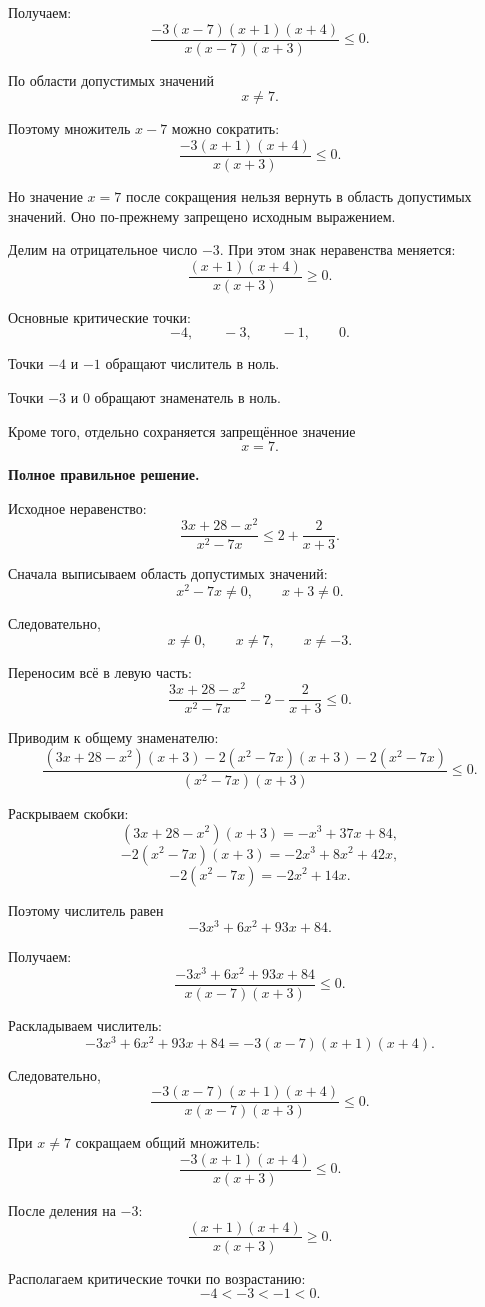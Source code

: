 \documentclass[12pt,a4paper]{article}
\begin{document}
Получаем:
\[
\frac{-3(x-7)(x+1)(x+4)}
{x(x-7)(x+3)}
\le0.
\]

По области допустимых значений
\[
x\ne7.
\]

Поэтому множитель $x-7$ можно сократить:
\[
\frac{-3(x+1)(x+4)}
{x(x+3)}
\le0.
\]

Но значение $x=7$ после сокращения нельзя вернуть в область допустимых
значений. Оно по-прежнему запрещено исходным выражением.

Делим на отрицательное число $-3$. При этом знак неравенства меняется:
\[
\frac{(x+1)(x+4)}
{x(x+3)}
\ge0.
\]

Основные критические точки:
\[
-4,\qquad -3,\qquad -1,\qquad 0.
\]

Точки $-4$ и $-1$ обращают числитель в ноль.

Точки $-3$ и $0$ обращают знаменатель в ноль.

Кроме того, отдельно сохраняется запрещённое значение
\[
x=7.
\]

\textbf{Полное правильное решение.}

Исходное неравенство:
\[
\frac{3x+28-x^2}{x^2-7x}
\le
2+\frac{2}{x+3}.
\]

Сначала выписываем область допустимых значений:
\[
x^2-7x\ne0,
\qquad
x+3\ne0.
\]

Следовательно,
\[
x\ne0,\qquad x\ne7,\qquad x\ne-3.
\]

Переносим всё в левую часть:
\[
\frac{3x+28-x^2}{x^2-7x}
-
2
-
\frac{2}{x+3}
\le0.
\]

Приводим к общему знаменателю:
\[
\frac{
(3x+28-x^2)(x+3)
-2(x^2-7x)(x+3)
-2(x^2-7x)
}{
(x^2-7x)(x+3)
}
\le0.
\]

Раскрываем скобки:
\[
(3x+28-x^2)(x+3)
=
-x^3+37x+84,
\]
\[
-2(x^2-7x)(x+3)
=
-2x^3+8x^2+42x,
\]
\[
-2(x^2-7x)
=
-2x^2+14x.
\]

Поэтому числитель равен
\[
-3x^3+6x^2+93x+84.
\]

Получаем:
\[
\frac{-3x^3+6x^2+93x+84}
{x(x-7)(x+3)}
\le0.
\]

Раскладываем числитель:
\[
-3x^3+6x^2+93x+84
=
-3(x-7)(x+1)(x+4).
\]

Следовательно,
\[
\frac{-3(x-7)(x+1)(x+4)}
{x(x-7)(x+3)}
\le0.
\]

При $x\ne7$ сокращаем общий множитель:
\[
\frac{-3(x+1)(x+4)}
{x(x+3)}
\le0.
\]

После деления на $-3$:
\[
\frac{(x+1)(x+4)}
{x(x+3)}
\ge0.
\]

Располагаем критические точки по возрастанию:
\[
-4<-3<-1<0.
\]
\end{document}
